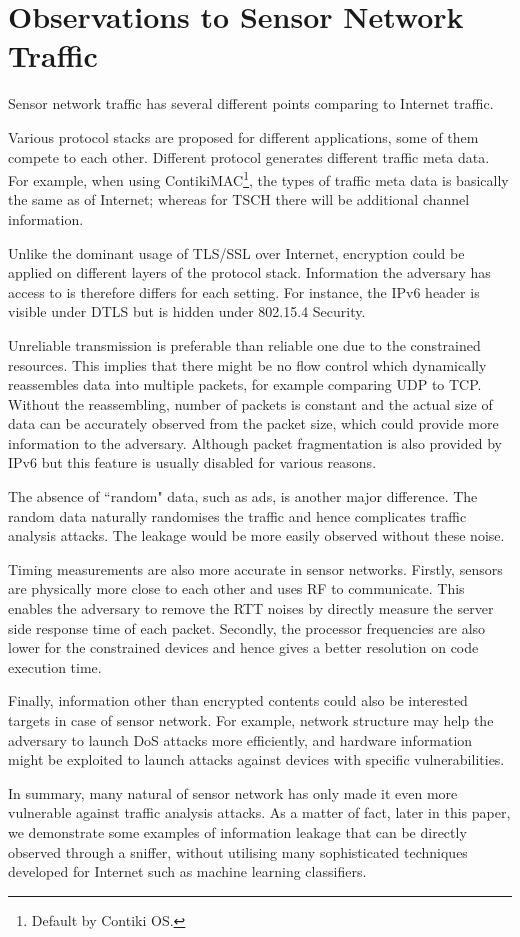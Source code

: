 \section{Observations to Sensor Network Traffic}

Sensor network traffic has several different points comparing to Internet traffic.

Various protocol stacks are proposed for different applications, some of them compete to each other. Different protocol generates different traffic meta data. For example, when using ContikiMAC\cite{ContikiMAC}\footnote{Default by Contiki OS.}, the types of traffic meta data is basically the same as of Internet; whereas for TSCH\cite{rfc7554} there will be additional channel information. 
	
Unlike the dominant usage of TLS/SSL over Internet, encryption could be applied on different layers of the protocol stack. Information the adversary has access to is therefore differs for each setting. For instance, the IPv6 header is visible under DTLS\cite{rfc6347} but is hidden under 802.15.4 Security\cite{802154}.

Unreliable transmission is preferable than reliable one due to the constrained resources. This implies that there might be no flow control which dynamically reassembles data into multiple packets, for example comparing UDP to TCP. Without the reassembling, number of packets is constant and the actual size of data can be accurately observed from the packet size, which could provide more information to the adversary. Although packet fragmentation is also provided by IPv6 but this feature is usually disabled for various reasons.

The absence of ``random" data, such as ads, is another major difference. The random data naturally randomises the traffic and hence complicates traffic analysis attacks. The leakage would be more easily observed without these noise.

Timing measurements are also more accurate in sensor networks. Firstly, sensors are physically more close to each other and uses RF to communicate. This enables the adversary to remove the RTT noises by directly measure the server side response time of each packet. Secondly, the processor frequencies are also lower for the constrained devices and hence gives a better resolution on code execution time.

Finally, information other than encrypted contents could also be interested targets in case of sensor network. For example, network structure may help the adversary to launch DoS attacks more efficiently, and hardware information might be exploited to launch attacks against devices with specific vulnerabilities.

In summary, many natural of sensor network has only made it even more vulnerable against traffic analysis attacks. As a matter of fact, later in this paper, we demonstrate some examples of information leakage that can be directly observed through a sniffer, without utilising many sophisticated techniques developed for Internet such as machine learning classifiers.
